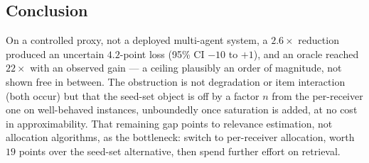 \documentclass[sigconf,anonymous]{aamas}
\theoremstyle{remark}
\begin{document}
\subsection{Conclusion}

On a controlled proxy, not a deployed multi-agent system, a
$2.6\times$ reduction produced an uncertain $4.2$-point loss (95\% CI
$-10$ to $+1$), and an oracle reached $22\times$ with an observed gain
--- a ceiling plausibly an order of magnitude, not shown free in
between. The obstruction is not degradation or item interaction (both
occur) but that the seed-set object is off by a factor $n$ from the
per-receiver one on well-behaved instances, unboundedly once saturation
is added, at no cost in approximability. That remaining gap points to
relevance estimation, not allocation algorithms, as the bottleneck:
switch to per-receiver allocation, worth $19$ points over the seed-set
alternative, then spend further effort on retrieval.

\balance


\end{document}
